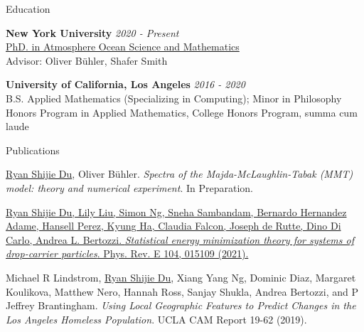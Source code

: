 \documentclass{resume} %
\begin{document}

\begin{rSection}{Education}

{\bf New York University} \hfill {\em 2020 - Present} \\
\href{https://caos.cims.nyu.edu/dynamic/phd-program/overview}{PhD. in Atmosphere Ocean Science and Mathematics}\\
Advisor: Oliver B\"uhler, Shafer Smith

{\bf University of California, Los Angeles} \hfill {\em 2016 - 2020} \\
B.S. Applied Mathematics (Specializing in Computing); Minor in Philosophy\\
Honors Program in Applied Mathematics, College Honors Program, summa cum laude

\end{rSection}


\begin{rSection}{Publications}

\begin{etaremune}
    \item \underline{Ryan Shijie Du}, Oliver B\"uhler. \textit{Spectra of the Majda-McLaughlin-Tabak (MMT) model: theory and numerical experiment}. In Preparation.
    \item \href{https://doi.org/10.1103/PhysRevE.104.015109}{\underline{Ryan Shijie Du}, Lily Liu, Simon Ng, Sneha Sambandam, Bernardo Hernandez Adame, Hansell Perez, Kyung Ha, Claudia Falcon, Joseph de Rutte, Dino Di Carlo, Andrea L. Bertozzi. \textit{Statistical energy minimization theory for systems of drop-carrier particles}. Phys. Rev. E 104, 015109 (2021).}

    \item Michael R Lindstrom, \underline{Ryan Shijie Du}, Xiang Yang Ng, Dominic Diaz, Margaret Koulikova, Matthew Nero, Hannah Ross, Sanjay Shukla, Andrea Bertozzi, and P Jeffrey Brantingham. \textit{Using Local Geographic Features to Predict Changes in the Los Angeles Homeless Population}. UCLA CAM Report 19-62 (2019).
\end{etaremune}
\end{rSection}
\end{document}

